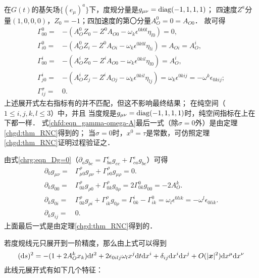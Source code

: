 在$G(t)$的基矢场$\{(e_\mu)^a\}$下，度规分量是$g_{\mu\nu}={\rm diag}(-1,1,1,1)$；
四速度$Z^a$分量$(1,0,0,0)$，$Z_0 = -1$；四加速度的第〇分量$A_O^0=0= A_{O0}$．
故可得
\begin{subequations}\label{chfd:eqn_gamma-omega-A}
\begin{align}
    \Gamma^0_{00} =& -(A^0_O Z_0 -Z^0 A_{O0}- \omega_k \epsilon^{0k0l}\eta_{l0}) = 0, \\
    \Gamma^0_{i0} =& -(A^0_O Z_i -Z^0 A_{Oi}- \omega_k \epsilon^{0k0l}\eta_{li}) = A_{Oi}= A_{O}^i, \\
    \Gamma^i_{00} =& -(A^i_O Z_0 -Z^i A_{O0}- \omega_k \epsilon^{0kil}\eta_{l0}) = A_{O}^i, \\
    \Gamma^i_{j0} =& -(A^i_O Z_j -Z^i A_{Oj}- \omega_k \epsilon^{0kil}\eta_{lj}) =
      \omega_k \epsilon^{0kij} = - \omega^k \epsilon_{0kij} ; \\
    \Gamma^\sigma_{ij} =& 0  . 
\end{align}
\end{subequations}
上述展开式左右指标有的并不匹配，但这不影响最终结果；
在纯空间（$1\leqslant i,j,k,l \leqslant 3$）中，并且
当度规是$g_{\mu\nu}={\rm diag}(-1,1,1,1)$时，纯空间指标在上在下都一样．
式\eqref{chfd:eqn_gamma-omega-A}最后一式（除$\sigma=0$外）是由定理\ref{chgd:thm_RNC}得到的；
当$\sigma=0$时，$x^0=\tau$是常数，可仿照定理\ref{chgd:thm_RNC}证明过程验证之．


由式\eqref{chrg:eqn_Dg=0}（$\partial_a g_{bc} = \Gamma_{ba}^e g_{ec} + \Gamma_{ca}^e g_{be}$）可得
\begin{subequations}\label{chfd:eqn_g-omega-A}
\begin{align}
    \partial_0 g_{\mu\nu} =& \Gamma_{\mu 0}^\rho g_{\rho\nu} + \Gamma_{\nu 0}^\rho g_{\mu \rho}=0. \\
    \partial_k g_{00} =& \Gamma_{0 k}^\rho g_{\rho 0} + \Gamma_{0 k}^\rho g_{0 \rho}
      = 2\Gamma_{0 k}^0 g_{0 0} =  -2 A_{O}^k .\\
    \partial_k g_{0i} =& \Gamma_{0 k}^\rho g_{\rho i} + \Gamma_{i k}^\rho g_{0 \rho}
      =\Gamma_{0 k}^i  - \Gamma_{i k}^0 =  \omega_l \epsilon^{0lik} =  -\omega^l \epsilon_{0lik}. \\
    \partial_k g_{ij} =& 0 .  
\end{align}
\end{subequations}
上面最后一式是由定理\ref{chgd:thm_RNC}得到的．

若度规线元只展开到一阶精度，那么由上式可以得到
\setlength{\mathindent}{0em}
\begin{equation}\label{chfd:eqn_g-O1st}
    ({\rm d}s)^2 = -(1+2 A_O^k x_k) {\rm d}t^2
      + 2 \epsilon_{0ilj} \omega_l x^j {\rm d}t {\rm d}x^i
      + \delta_{ij} {\rm d}x^i {\rm d}x^j
      + O(|\boldsymbol{x}|^2){\rm d}x^\mu {\rm d}x^\nu 
\end{equation}\setlength{\mathindent}{2em}
此线元展开式有如下几个特征：

